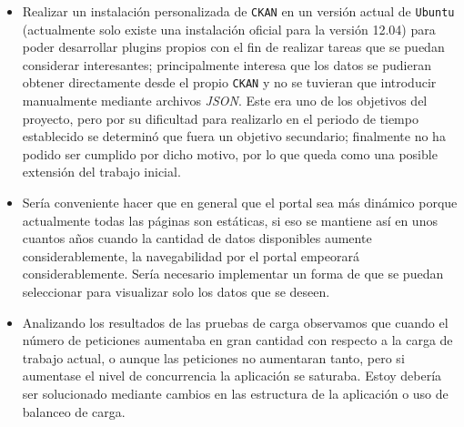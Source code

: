 \begin{itemize}
	\item Realizar un instalación personalizada de {\tt CKAN} en un versión actual de {\tt Ubuntu} (actualmente solo existe una instalación oficial para la versión 12.04) para poder desarrollar
	plugins propios con el fin de realizar tareas que se puedan considerar interesantes; principalmente interesa que los datos se pudieran obtener directamente desde el propio {\tt CKAN} y no se tuvieran que introducir manualmente mediante archivos \textit{JSON}. Este era uno de los objetivos del proyecto, pero por su dificultad para realizarlo en el periodo de tiempo establecido se determinó que fuera un objetivo secundario; finalmente no ha podido ser cumplido por dicho motivo, por lo que queda como una posible extensión del trabajo inicial.
	\item Sería conveniente hacer que en general que el portal sea más dinámico porque actualmente todas las páginas son estáticas, si eso se mantiene así en unos cuantos años cuando la cantidad de datos disponibles aumente considerablemente, la navegabilidad por el portal empeorará considerablemente. Sería necesario implementar un forma de que se puedan seleccionar para visualizar solo los datos que se deseen.
	\item Analizando los resultados de las pruebas de carga observamos que cuando el número de peticiones aumentaba en gran cantidad con respecto a la carga de trabajo actual, o aunque las peticiones no aumentaran tanto, pero si aumentase el nivel de concurrencia la aplicación se saturaba. Estoy debería ser solucionado mediante cambios en las estructura de la aplicación o uso de balanceo de carga.
\end{itemize}